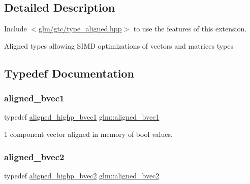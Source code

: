 \subsection{Detailed Description}
Include $<$\mbox{\hyperlink{gtc_2type__aligned_8hpp}{glm/gtc/type\+\_\+aligned.\+hpp}}$>$ to use the features of this extension.

Aligned types allowing S\+I\+MD optimizations of vectors and matrices types 

\subsection{Typedef Documentation}
\mbox{\label{group__gtc__type__aligned_ga7db5fd015b60682f3fdfe9cab47188dd}} 
\subsubsection{\texorpdfstring{aligned\+\_\+bvec1}{aligned\_bvec1}}
{\footnotesize\ttfamily typedef \mbox{\hyperlink{group__gtc__type__aligned_ga92b3b4333bdc881b8ae27414162df481}{aligned\+\_\+highp\+\_\+bvec1}} \mbox{\hyperlink{group__gtc__type__aligned_ga7db5fd015b60682f3fdfe9cab47188dd}{glm\+::aligned\+\_\+bvec1}}}



1 component vector aligned in memory of bool values. 

\mbox{\label{group__gtc__type__aligned_ga58579cb7fcfb892d0ae1f085327ae2ca}} 
\subsubsection{\texorpdfstring{aligned\+\_\+bvec2}{aligned\_bvec2}}
{\footnotesize\ttfamily typedef \mbox{\hyperlink{group__gtc__type__aligned_gafa71bded1fc2dd68608207de49a96870}{aligned\+\_\+highp\+\_\+bvec2}} \mbox{\hyperlink{group__gtc__type__aligned_ga58579cb7fcfb892d0ae1f085327ae2ca}{glm\+::aligned\+\_\+bvec2}}}



